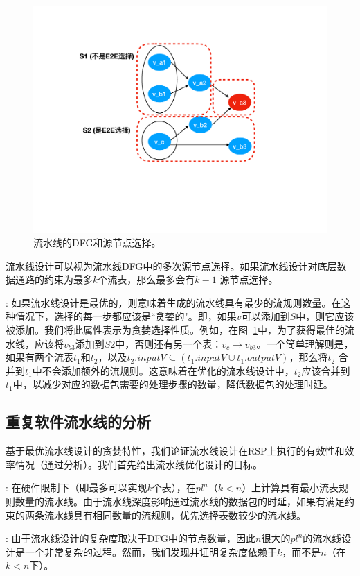 \begin{figure}[!htbp]
\includegraphics[width=0.8\linewidth]{figures/lp-67.pdf}
\centering
\vspace{-3mm}
\caption{\small 流水线的DFG和源节点选择。}
\label{fig:dfg}
\end{figure}

流水线设计可以视为流水线DFG中的多次源节点选择。如果流水线设计对底层数据通路的约束为最多$k$个流表，那么最多会有$k-1$ 源节点选择。

: 如果流水线设计是最优的，则意味着生成的流水线具有最少的流规则数量。在这种情况下，选择的每一步都应该是``贪婪的"。即，如果$v$可以添加到$S$中，则它应该被添加。我们将此属性表示为贪婪选择性质。例如，在图~\ref{fig:dfg}中，为了获得最佳的流水线，应该将$v_{b3}$添加到$S2$中，否则还有另一个表：$v_c \rightarrow v_{b3}$。一个简单理解则是，如果有两个流表$t_1$和$t_2$，以及$t_2.inputV \subseteq (t_1.inputV \cup t_1.outputV)$，那么将$t_2$ 合并到$t_1$中不会添加额外的流规则。这意味着在优化的流水线设计中，$t_2$应该合并到$t_1$中，以减少对应的数据包需要的处理步骤的数量，降低数据包的处理时延。

\subsection{重复软件流水线的分析}
基于最优流水线设计的贪婪特性，我们论证流水线设计在RSP上执行的有效性和效率情况（通过分析）。我们首先给出流水线优化设计的目标。

: 在硬件限制下（即最多可以实现$k$个表），在$pl^n$（$k < n$）上计算具有最小流表规则数量的流水线。由于流水线深度影响通过流水线的数据包的时延，如果有满足约束的两条流水线具有相同数量的流规则，优先选择表数较少的流水线。

: 由于流水线设计的复杂度取决于DFG中的节点数量，因此$n$很大的$pl^n$的流水线设计是一个非常复杂的过程。然而，我们发现并证明复杂度依赖于$k$，而不是$n$（在$k < n$下）。


